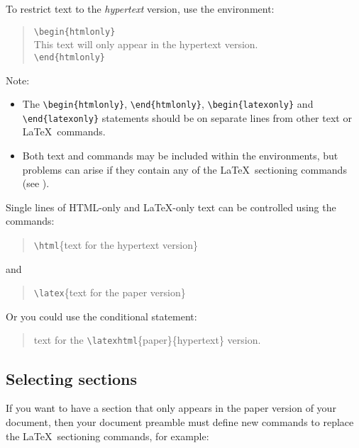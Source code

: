 \documentclass[twoside,11pt,nolof]{starlink}
\begin{document}
To restrict text to the \emph{hypertext}\/ version, use the environment:

\begin{quote}
\verb!\begin!\verb!{htmlonly}!\\
This text will only appear in the hypertext version. \\
\verb!\end!\verb!{htmlonly}!
\end{quote}

Note:

\begin{itemize}
\item The \verb!\begin!\verb!{htmlonly}!, \verb!\end!\verb!{htmlonly}!,
  \verb!\begin!\verb!{latexonly}! and \verb!\end!\verb!{latexonly}!
  statements should be on separate lines from other text or \LaTeX\ commands.
\item Both text and commands may be included within the environments,
  but problems can arise if they contain any of the \LaTeX\ sectioning commands
  (see
  ).
\end{itemize}

Single lines of HTML-only and \LaTeX\--only text can be controlled
using the commands:
\begin{quote}
\verb!\html!\{text for the hypertext version\}
\end{quote}
and
\begin{quote}
\verb!\latex!\{text for the paper version\}
\end{quote}
Or you could use the conditional statement:
\begin{quote}
text for the \verb!\latexhtml!\{paper\}\{hypertext\} version.
\end{quote}

\subsection{\label{selecting_sections}Selecting sections}

If you want to have a section that only appears in the paper version
of your document, then your document preamble must define new commands
to replace the \LaTeX\ sectioning commands, for example:

\begin{terminalv}
\providecommand{\latexonlysection}[1]{\section{#1}}
\providecommand{\latexonlysubsection}[1]{\subsection{#1}}
\providecommand{\latexonlysubsubsection}[1]{\subsubsection{#1}}

\end{terminalv}
\end{document}
